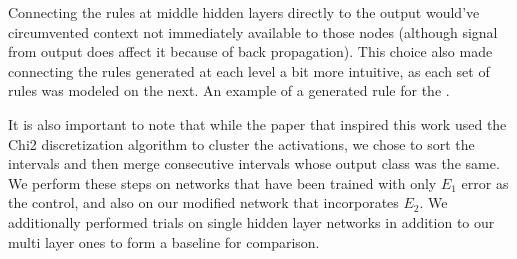  Connecting the rules at middle hidden layers directly to the output
 would’ve circumvented context not immediately available to those
 nodes (although signal from output does affect it because of back
 propagation). This choice also made connecting the rules generated at
 each level a bit more intuitive, as each set of rules was modeled on
 the next. An example of a generated rule for the .

It is also important to note that while the paper
that inspired this work \cite{thuan11} used the Chi2 discretization
algorithm to cluster the activations, we chose to sort the intervals
and then merge consecutive intervals whose output class was the same. We perform these steps on networks that have been trained with only $E_1$
error as the control, and also on our modified network that
incorporates $E_2$. We additionally performed trials on single hidden
layer networks in addition to our multi layer ones to form a baseline
for comparison. 

